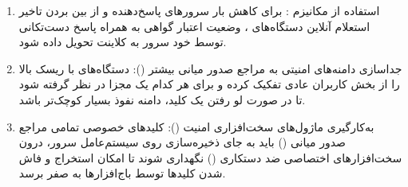 
\begin{enumerate}
    \item {استفاده از مکانیزم :} برای کاهش بار سرورهای پاسخ‌دهنده و از بین بردن تاخیر استعلام آنلاین دستگاه‌های ، وضعیت اعتبار گواهی به همراه پاسخ دست‌تکانی  توسط خود سرور به کلاینت تحویل داده شود.
    \item {جداسازی دامنه‌های امنیتی به مراجع صدور میانی بیشتر ():} دستگاه‌های  با ریسک بالا را از بخش کاربران عادی تفکیک کرده و برای هر کدام یک  مجزا در نظر گرفته شود تا در صورت لو رفتن یک کلید، دامنه نفوذ بسیار کوچک‌تر باشد.
    \item {به‌کارگیری ماژول‌های سخت‌افزاری امنیت ():} کلیدهای خصوصی تمامی مراجع صدور میانی () باید به جای ذخیره‌سازی روی سیستم‌عامل سرور، درون سخت‌افزارهای اختصاصی ضد دستکاری () نگهداری شوند تا امکان استخراج و فاش شدن کلیدها توسط باج‌افزارها به صفر برسد.
\end{enumerate}